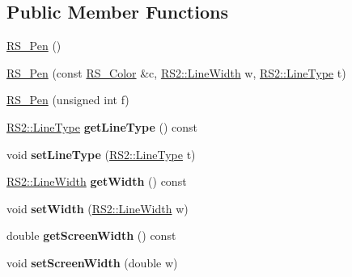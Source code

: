 \subsection*{Public Member Functions}
\begin{DoxyCompactItemize}
\item 
\hyperlink{classRS__Pen_acc9112fb19b55df4ab9758650575c36c}{R\-S\-\_\-\-Pen} ()
\item 
\hyperlink{classRS__Pen_afe052f4734862cc3221e3bb6372ed7a3}{R\-S\-\_\-\-Pen} (const \hyperlink{classRS__Color}{R\-S\-\_\-\-Color} \&c, \hyperlink{classRS2_a023485c482c5ee9e36b3dfad781adf29}{R\-S2\-::\-Line\-Width} w, \hyperlink{classRS2_a6f3a82972c2d62456f6cacb74e14c95f}{R\-S2\-::\-Line\-Type} t)
\item 
\hyperlink{classRS__Pen_a30859ffa70a7fefbce4ee1ae12555f37}{R\-S\-\_\-\-Pen} (unsigned int f)
\item 
\hypertarget{classRS__Pen_ade7422230225e3ddf3b1ca4dffa6fd11}{\hyperlink{classRS2_a6f3a82972c2d62456f6cacb74e14c95f}{R\-S2\-::\-Line\-Type} {\bfseries get\-Line\-Type} () const }\label{classRS__Pen_ade7422230225e3ddf3b1ca4dffa6fd11}

\item 
\hypertarget{classRS__Pen_ae2a2fb251a7efbfec5a01154063af84e}{void {\bfseries set\-Line\-Type} (\hyperlink{classRS2_a6f3a82972c2d62456f6cacb74e14c95f}{R\-S2\-::\-Line\-Type} t)}\label{classRS__Pen_ae2a2fb251a7efbfec5a01154063af84e}

\item 
\hypertarget{classRS__Pen_a3b75438a52d455e408f28699f38b0e5e}{\hyperlink{classRS2_a023485c482c5ee9e36b3dfad781adf29}{R\-S2\-::\-Line\-Width} {\bfseries get\-Width} () const }\label{classRS__Pen_a3b75438a52d455e408f28699f38b0e5e}

\item 
\hypertarget{classRS__Pen_ac92f53a8f9c4118b33a6d0fd1462f34a}{void {\bfseries set\-Width} (\hyperlink{classRS2_a023485c482c5ee9e36b3dfad781adf29}{R\-S2\-::\-Line\-Width} w)}\label{classRS__Pen_ac92f53a8f9c4118b33a6d0fd1462f34a}

\item 
\hypertarget{classRS__Pen_a440b941b50242b900a855ca9ed4d22ea}{double {\bfseries get\-Screen\-Width} () const }\label{classRS__Pen_a440b941b50242b900a855ca9ed4d22ea}

\item 
\hypertarget{classRS__Pen_a33fb782ac3ae1ef3da39b4ca3973adf2}{void {\bfseries set\-Screen\-Width} (double w)}\label{classRS__Pen_a33fb782ac3ae1ef3da39b4ca3973adf2}


\end{DoxyCompactItemize}
